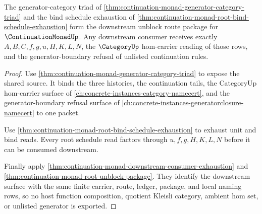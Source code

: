 \begin{theorem}
\label{thm:continuation-monad-downstream-unblock-route-package}
The generator-category triad of \autoref{thm:continuation-monad-generator-category-triad} and the bind schedule exhaustion of \autoref{thm:continuation-monad-root-bind-schedule-exhaustion} form the downstream unblock route package for $\ContinuationMonadUp$. Any downstream consumer receives exactly $A,B,C,f,g,u,H,K,L,N$, the $\CategoryUp$ hom-carrier reading of those rows, and the generator-boundary refusal of unlisted continuation rules.
\end{theorem}
\begin{proof}
Use \autoref{thm:continuation-monad-generator-category-triad} to expose the shared source. It binds the three histories, the continuation tails, the CategoryUp hom-carrier surface of \autoref{ch:concrete-instances-category-namecert}, and the generator-boundary refusal surface of \autoref{ch:concrete-instances-generatorclosure-namecert} to one packet.

Use \autoref{thm:continuation-monad-root-bind-schedule-exhaustion} to exhaust unit and bind reads. Every root schedule read factors through $u,f,g,H,K,L,N$ before it can be consumed downstream.

Finally apply \autoref{thm:continuation-monad-downstream-consumer-exhaustion} and \autoref{thm:continuation-monad-root-unblock-package}. They identify the downstream surface with the same finite carrier, route, ledger, package, and local naming rows, so no host function composition, quotient Kleisli category, ambient hom set, or unlisted generator is exported.
\end{proof}

